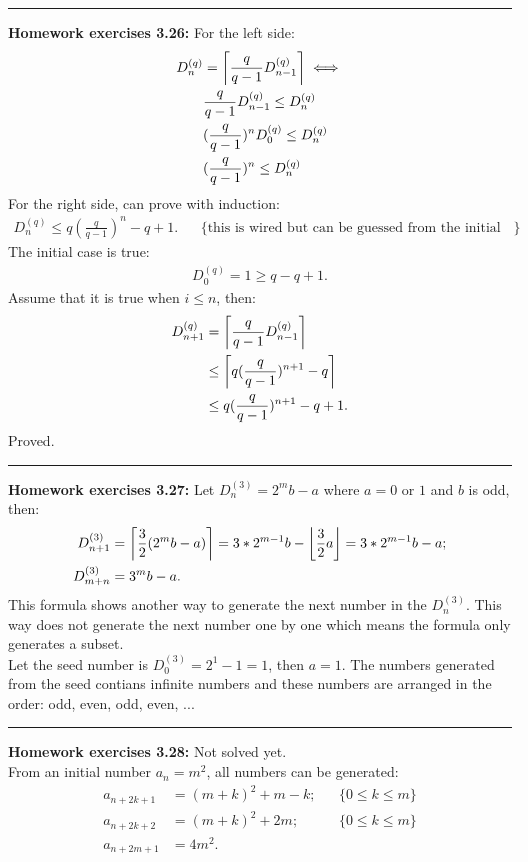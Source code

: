\documentclass{article}
\DeclarePairedDelimiter\ceil{\lceil}{\rceil}
\DeclarePairedDelimiter\floor{\lfloor}{\rfloor}
\begin{document}
\noindent\rule{\textwidth}{0.4pt}
\textbf{Homework exercises 3.26:}
For the left side:
\begin{align}
D_n^{(q)} &= \ceil*{\frac{q}{q-1} D_{n-1}^{(q)}} \iff\\
	  & \frac{q}{q-1} D_{n-1}^{(q)} \le D_n^{(q)} \\
	  & (\frac{q}{q-1})^n D_{0}^{(q)} \le D_n^{(q)} \\
	  & (\frac{q}{q-1})^n  \le D_n^{(q)} \
\end{align}
For the right side, can prove with induction:
\begin{align}
D_n^{(q)} \le q(\frac{q}{q-1})^n - q + 1. &&\{\text{this is wired but can be guessed from the initial case.}\}
\end{align}
The initial case is true:
\begin{align}
D_0^{(q)}  = 1 \ge q - q + 1.
\end{align}
Assume that it is true when $i \le n$, then:
\begin{align}
D_{n+1}^{(q)} &= \ceil*{\frac{q}{q-1} D_{n-1}^{(q)}} \\
	      &\le \ceil*{q(\frac{q}{q-1})^{n+1} - q} \\
	      &\le q(\frac{q}{q-1})^{n+1} - q + 1.
\end{align}
Proved.

\noindent\rule{\textwidth}{0.4pt}
\textbf{Homework exercises 3.27:}
Let $D_n^{(3)} = 2^m b - a$ where $a = 0\text{ or }1$ and $b$ is odd, then:
\begin{align}
D_{n+1}^{(3)} &= \ceil*{\frac{3}{2} (2^m b - a)} = 3 * 2^{m-1} b - \floor*{\frac{3}{2}a} = 3 * 2^{m-1} b  - a; \\
D_{m+n}^{(3)} &= 3^m b - a.
\end{align}
This formula shows another way to generate the next number in the $D_n^{(3)}$.
This way does not generate the next number one by one which means the formula only generates a subset.\\
Let the seed number is $D_0^{(3)} = 2^1 - 1 = 1$, then $a=1$.
The numbers generated from the seed contians infinite numbers and these numbers are arranged in the order: odd, even, odd, even, ...

\noindent\rule{\textwidth}{0.4pt}
\textbf{Homework exercises 3.28:}
Not solved yet.\\
From an initial number $a_n = m^2$, all numbers can be generated:
\begin{align}
a_{n + 2k + 1} &= (m+k)^2 + m - k; && \{0 \le k \le m \} \\
a_{n + 2k + 2} &= (m+k)^2 + 2m; && \{0 \le k \le m \} \\
a_{n + 2m + 1} &= 4m^2.
\end{align}
\end{document}
